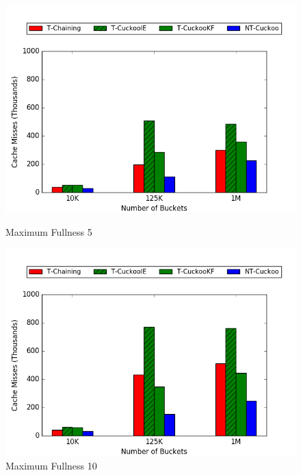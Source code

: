 \begin{figure}[H]
    \centering
    \begin{minipage}{.5\textwidth}
    \centering
        \includegraphics[width=\linewidth]{maps/905cm.png}
        \caption*{Maximum Fullness 5}
    \end{minipage}
    \begin{minipage}{.5\textwidth}
    \centering
        \includegraphics[width=\linewidth]{maps/9010cm.png}
        \caption*{Maximum Fullness 10}
    \end{minipage}
    \begin{minipage}{.5\textwidth}
    \centering

\end{minipage}
\end{figure}
